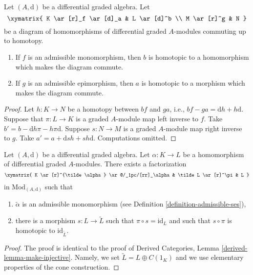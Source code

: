\begin{lemma}
\label{lemma-make-commute-map}
Let $(A, \text{d})$ be a differential graded algebra. Let
$$
\xymatrix{
K \ar[r]_f \ar[d]_a & L \ar[d]^b \\
M \ar[r]^g & N
}
$$
be a diagram of homomorphisms of differential graded $A$-modules
commuting up to homotopy.
\begin{enumerate}
\item If $f$ is an admissible monomorphism, then $b$ is homotopic to a
homomorphism which makes the diagram commute.
\item If $g$ is an admissible epimorphism, then $a$ is homotopic to a
morphism which makes the diagram commute.
\end{enumerate}
\end{lemma}

\begin{proof}
Let $h : K \to N$ be a homotopy between $bf$ and $ga$, i.e.,
$bf - ga = \text{d}h + h\text{d}$. Suppose that $\pi : L \to K$
is a graded $A$-module map left inverse to $f$. Take
$b' = b - \text{d}h\pi - h\pi \text{d}$.
Suppose $s : N \to M$ is a graded $A$-module map right inverse to $g$.
Take $a' = a + \text{d}sh + sh\text{d}$.
Computations omitted.
\end{proof}

\begin{lemma}
\label{lemma-make-injective}
Let $(A, \text{d})$ be a differential graded algebra.
Let $\alpha : K \to L$ be a homomorphism of differential graded
$A$-modules. There exists a factorization
$$
\xymatrix{
K \ar[r]^{\tilde \alpha} \ar@/_1pc/[rr]_\alpha &
\tilde L \ar[r]^\pi & L
}
$$
in $\text{Mod}_{(A, \text{d})}$ such that
\begin{enumerate}
\item $\tilde \alpha$ is an admissible monomorphism (see
Definition \ref{definition-admissible-ses}),
\item there is a morphism $s : L \to \tilde L$
such that $\pi \circ s = \text{id}_L$ and such that
$s \circ \pi$ is homotopic to $\text{id}_{\tilde L}$.
\end{enumerate}
\end{lemma}

\begin{proof}
The proof is identical to the proof of
Derived Categories, Lemma \ref{derived-lemma-make-injective}.
Namely, we set $\tilde L = L \oplus C(1_K)$ and we use elementary
properties of the cone construction.
\end{proof}

